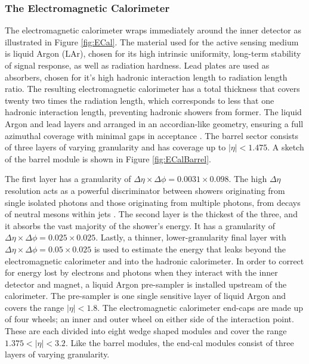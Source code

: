 \subsubsection{The Electromagnetic Calorimeter}
The electromagnetic calorimeter wraps immediately around the inner detector as illustrated in Figure \ref{fig:ECal}. The material used for the active sensing medium is liquid Argon (LAr), chosen for its high intrinsic uniformity, long-term stability of signal response, as well as radiation hardness\cite{?}. Lead plates are used as absorbers, chosen for it's high hadronic interaction length to radiation length ratio. The resulting electromagnetic calorimeter has a total thickness that covers twenty two times the radiation length, which corresponds to less that one hadronic interaction length, preventing hadronic showers from former. The liquid Argon and lead layers and arranged in an accordian-like geometry, ensuring a full azimuthal coverage with minimal gaps in acceptance . The barrel sector consists of three layers of varying granularity and has coverage up to $|\eta| < 1.475$. A sketch of the barrel module is shown in Figure \ref{fig:ECalBarrel}. 

The first layer has a granularity of $\Delta\eta\times\Delta\phi=0.0031\times 0.098$. The high $\Delta\eta$ resolution acts as a powerful discriminator between showers originating from single isolated photons and those originating from multiple photons, from decays of neutral mesons within jets . The second layer is the thickest of the three, and it absorbs the vast majority of the shower's energy. It has a granularity of $\Delta\eta\times\Delta\phi=0.025\times 0.025$. Lastly, a thinner, lower-granularity final layer with $\Delta\eta\times\Delta\phi=0.05\times 0.025$ is used to estimate the energy that leaks beyond the electromagnetic calorimeter and into the hadronic calorimeter. In order to correct for energy lost by electrons and photons when they interact with the inner detector and magnet, a liquid Argon pre-sampler is installed upstream of the calorimeter. The pre-sampler is one single sensitive layer of liquid Argon and covers the range $|\eta| < 1.8$. The electromagnetic calorimeter end-caps are made up of four wheels; an inner and outer wheel on either side of the interaction point. These are each divided into eight wedge shaped modules and cover the range $1.375 < |\eta| < 3.2$. Like the barrel modules, the end-cal modules consist of three layers of varying granularity.

